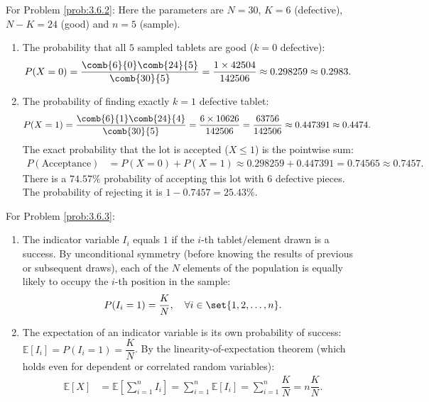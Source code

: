 \begin{solucion}
	\label{sol:3.6.2}
	For Problem \ref{prob:3.6.2}:
	Here the parameters are $N=30$, $K=6$ (defective), $N-K=24$ (good) and $n=5$ (sample).
	\begin{enumerate}
		\item The probability that all $5$ sampled tablets are good ($k=0$ defective):
		\begin{align*}
			P(X = 0) &= \dfrac{\comb{6}{0}\comb{24}{5}}{\comb{30}{5}} = \dfrac{1 \times 42504}{142506} \approx 0.298259 \approx 0.2983.
		\end{align*}
		\item The probability of finding exactly $k=1$ defective tablet:
		\begin{align*}
			P(X = 1) &= \dfrac{\comb{6}{1}\comb{24}{4}}{\comb{30}{5}} = \dfrac{6 \times 10626}{142506} = \dfrac{63756}{142506} \approx 0.447391 \approx 0.4474.
		\end{align*}
		The exact probability that the lot is accepted ($X \le 1$) is the pointwise sum:
		\begin{align*}
			P(\text{Acceptance}) &= P(X = 0) + P(X = 1) \approx 0.298259 + 0.447391 = 0.74565 \approx 0.7457.
		\end{align*}
		There is a $74.57\%$ probability of accepting this lot with 6 defective pieces. The probability of rejecting it is $1 - 0.7457 = 25.43\%$.
	\end{enumerate}
\end{solucion}

\begin{solucion}
	\label{sol:3.6.3}
	For Problem \ref{prob:3.6.3}:
	\begin{enumerate}
		\item The indicator variable $I_i$ equals $1$ if the $i$-th tablet/element drawn is a success. By unconditional symmetry (before knowing the results of previous or subsequent draws), each of the $N$ elements of the population is equally likely to occupy the $i$-th position in the sample:
		\begin{align*}
			P(I_i = 1) = \dfrac{K}{N}, \quad \forall i \in \set{1, 2, \dots, n}.
		\end{align*}
		\item The expectation of an indicator variable is its own probability of success: $\mathbb{E}[I_i] = P(I_i = 1) = \dfrac{K}{N}$. By the linearity-of-expectation theorem (which holds even for dependent or correlated random variables):
		\begin{align*}
			\mathbb{E}[X] &= \mathbb{E}\left[\sum_{i=1}^n I_i\right] = \sum_{i=1}^n \mathbb{E}[I_i] = \sum_{i=1}^n \dfrac{K}{N} = n \dfrac{K}{N}.
		\end{align*}
	\end{enumerate}
\end{solucion}

